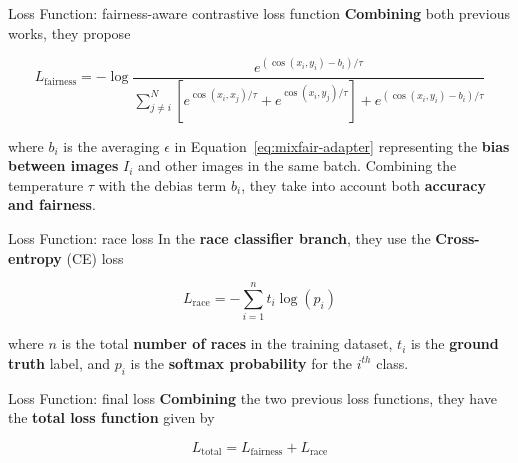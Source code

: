 \documentclass[aspectratio=169,xcolor=dvipsnames]{beamer}
\begin{document}

\begin{frame}{Loss Function: fairness-aware contrastive loss function}
    \textbf{Combining} both previous works, they propose
    
    \begin{equation}
      L_{\text{fairness}} = -\log \frac{e^{\left(\cos(x_i,y_i) - b_i\right)/\tau}}{\sum_{j\neq i}^N \left[e^{\cos(x_i,x_j)/\tau} + e^{\cos(x_i,y_j)/\tau}\right] + e^{\left(\cos(x_i,y_i)-b_i\right)/\tau}} \tag{4}
    \end{equation}

    where $b_i$ is the averaging $\epsilon$ in Equation~\ref{eq:mixfair-adapter} representing the \textbf{bias between images} $I_i$ and other images in the same batch. Combining the temperature $\tau$ with the debias term $b_i$, they take into account both \textbf{accuracy and fairness}.
\end{frame}


\begin{frame}{Loss Function: race loss}
    In the \textbf{race classifier branch}, they use the \textbf{Cross-entropy} (CE) loss 

    \begin{equation}
        L_{\text{race}} = - \sum_{i=1}^n t_i \log(p_i) \tag{5}
    \end{equation}

    where $n$ is the total \textbf{number of races} in the training dataset, $t_i$ is the \textbf{ground truth} label, and $p_i$ is the \textbf{softmax probability} for the $i^{th}$ class.
\end{frame}


\begin{frame}{Loss Function: final loss}
    \textbf{Combining} the two previous loss functions, they have the \textbf{total loss function} given by

    \begin{equation}
        L_{\text{total}} = L_{\text{fairness}} + L_{\text{race}} \tag{6}
    \end{equation}
\end{frame}

\end{document}
